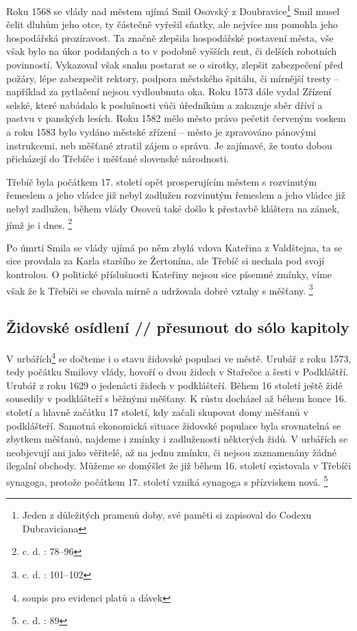 \documentclass[a4paper,oneside,12p]{report}
\begin{document}
Roku 1568 se vlády nad městem ujímá Smil Osovský z Doubravice\footnote{Jeden z důležitých pramenů doby, své paměti si zapisoval do Codexu Dubraviciana}
Smil musel čelit dluhům jeho otce, ty částečně vyřešil sňatky, ale nejvíce mu pomohla jeho hospodářská prozíravost.
Ta značně zlepšila hospodářské postavení města, vše však bylo na úkor poddaných a to v podobně vyšších rent, či delších robotních povinností.
Vykazoval však snahu postarat se o sirotky, zlepšit zabezpečení před požáry, lépe zabezpečit rektory, podpora městského špitálu, či mírnější tresty -- například za pytlačení nejsou vydloubnuta oka.
Roku 1573 dále vydal Zřízení selské, které nabádalo k poslušnosti vůči úředníkům a zakazuje sběr dříví a pastvu v panských lesích.
Roku 1582 mělo město právo pečetit červeným voskem a roku 1583 bylo vydáno městské zřízení -- město je zpravováno pánovými instrukcemi, neb měšťané ztratil zájem o správu. %
Je zajímavé, že touto dobou přicházejí do Třebíče i měšťané slovenské národnosti.

Třebíč byla počátkem 17. století opět prosperujícím městem s rozvinutým řemeslem a jeho vládce již nebyl zadlužen rozvinutým řemeslem a jeho vládce již nebyl zadlužen, během vlády Osovců také došlo k přestavbě kláštera na zámek, jímž je i dnes. \footnote{c. d. : 78--96}

Po úmrtí Smila se vlády ujímá po něm zbylá vdova Kateřina z Valdštejna, ta se sice provdala za Karla staršího ze Žertonína, ale Třebíč si nechala pod svojí kontrolou.
O politické příslušnosti Kateřiny nejsou sice písemné zmínky, víme však že k Třebíči se chovala mírně a udržovala dobré vztahy s měšťany. \footnote{c. d. : 101--102}

\subsection{Židovské osídlení // přesunout do sólo kapitoly}

V urbářích\footnote{soupis pro evidenci platů a dávek} se dočteme i o stavu židovské populaci ve městě.
Urubář z roku 1573, tedy počátku Smilovy vlády, hovoří o dvou židech v Stařečce a šesti v Podkláštří.
Urubář z roku 1629 o jedenácti židech v podklášteří.
Během 16 století ještě židé sousedily v podklášteří s běžnými měšťany.
K růstu docházel až během konce 16. století a hlavně začátku 17 století, kdy začali skupovat domy měšťanů v podklášteří.
Samotná ekonomická situace židovské populace byla srovnatelná se zbytkem měšťanů, najdeme i zmínky i zadluženosti některých židů.
V urbářích se neobjevují ani jako věřitelé, až na jednu zmínku, či nejsou zaznamenány žádné ilegalní obchody.
Můžeme se domýšlet že již během 16. století existovala v Třebíči synagoga, protože počátkem 17. století vzniká synagoga s přízviskem nová. \footnote{c. d. : 89}
\end{document}
